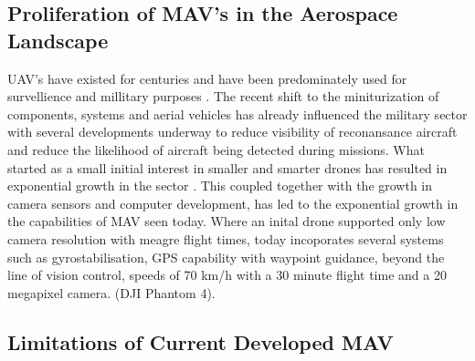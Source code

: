 \subsection{Proliferation of MAV's in the Aerospace Landscape}
\label{subsec:ProliferationMAVs}

UAV's have existed for centuries and have been predominately used for survellience and millitary purposes . The recent shift to the miniturization of components, systems and aerial vehicles has already influenced the military sector with several developments underway to reduce visibility of reconansance aircraft and reduce the likelihood of aircraft being detected during missions. What started as a small initial interest in smaller and smarter drones has resulted in exponential growth in the sector . This coupled together with the growth in camera sensors and computer development, has led to the exponential growth in the capabilities of MAV seen today. Where an inital drone supported only low camera resolution with meagre flight times, today incoporates several systems such as gyrostabilisation, GPS capability with waypoint guidance, beyond the line of vision control, speeds of 70 km/h with a 30 minute flight time and a 20 megapixel camera. (DJI Phantom 4). \\


\subsection{Limitations of Current Developed MAV}
\label{subsec:Limitations}

